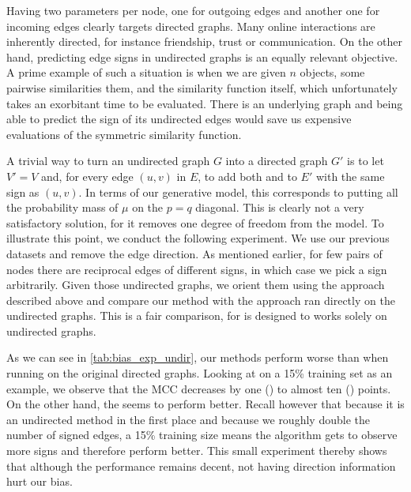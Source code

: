 Having two parameters per node, one for outgoing edges and another one for incoming edges clearly
targets directed graphs. Many online interactions are inherently directed, for instance friendship,
trust or communication. On the other hand, predicting edge signs in undirected graphs is an equally
relevant objective. A prime example of such a situation is when we are given $n$ objects, some
pairwise similarities them, and the similarity function itself, which unfortunately takes an
exorbitant time to be evaluated. There is an underlying graph and being able to predict the sign of
its undirected edges would save us expensive evaluations of the symmetric similarity function.

A trivial way to turn an undirected graph $G$ into a directed graph $G'$ is to let $V'=V$ and, for
every edge $(u,v)$ in $E$, to add both \euv{} and \evu{} to $E'$ with the same sign as $(u,v)$. In
terms of our generative model, this corresponds to putting all the probability mass of $\mu$ on the
$p=q$ diagonal. This is clearly not a very satisfactory solution, for it removes one degree of
freedom from the model. To illustrate this point, we conduct the following experiment. We use our
previous \dssn{} datasets and remove the edge direction. As mentioned earlier, for few pairs of
nodes there are reciprocal edges of different signs, in which case we pick a sign arbitrarily. Given
those undirected graphs, we orient them using the approach described above and compare our method
with the \complowrank{} approach ran directly on the undirected graphs. This is a fair comparison,
for \complowrank{} is designed to works solely on undirected graphs.

As we can see in \autoref{tab:bias_exp_undir}, our methods perform worse than when running on the
original directed graphs. Looking at \uslpropGsec{} on a 15\% training set as an example, we observe
that the MCC decreases by one (\kiw{}) to almost ten (\epi{}) points. On the other hand, the
\complowrank{} seems to perform better. Recall however that because it is an undirected method in
the first place and because we roughly double the number of signed edges, a 15\% training size means
the algorithm gets to observe more signs and therefore perform better. This small experiment thereby
shows that although the performance remains decent, not having direction information hurt our bias.


